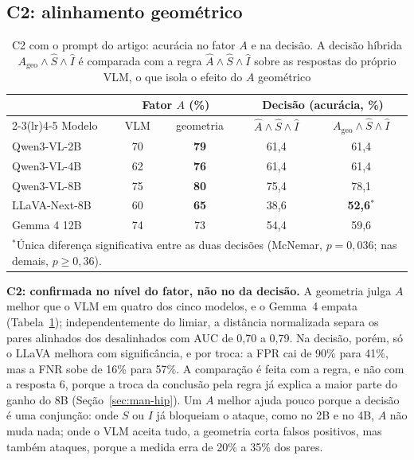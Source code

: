 \documentclass[conference]{IEEEtran}
\newcommand{\Ageo}{A_{\mathrm{geo}}}
\begin{document}
\subsection{C2: alinhamento geométrico}
\label{sec:man-c2}

\begin{table}[!t]
\renewcommand{\arraystretch}{1.05}
\caption{C2 com o prompt do artigo: acurácia no fator $A$ e na decisão. A decisão híbrida
$\Ageo\wedge\hat S\wedge\hat I$ é comparada com a regra $\hat A\wedge\hat S\wedge\hat I$ sobre as
respostas do próprio VLM, o que isola o efeito do $A$ geométrico}
\label{tab:c2}
\centering
\footnotesize
\setlength{\tabcolsep}{4pt}
\begin{tabular}{lcccc}
\toprule
 & \multicolumn{2}{c}{Fator $A$ (\%)} & \multicolumn{2}{c}{Decisão (acurácia, \%)} \\
\cmidrule(lr){2-3}\cmidrule(lr){4-5}
Modelo & VLM & geometria & $\hat A\wedge\hat S\wedge\hat I$ & $\Ageo\wedge\hat S\wedge\hat I$ \\
\midrule
Qwen3-VL-2B   & 70 & \textbf{79} & 61,4 & 61,4 \\
Qwen3-VL-4B   & 62 & \textbf{76} & 61,4 & 61,4 \\
Qwen3-VL-8B   & 75 & \textbf{80} & 75,4 & 78,1 \\
LLaVA-Next-8B & 60 & \textbf{65} & 38,6 & \textbf{52,6}$^{*}$ \\
Gemma 4 12B   & 74 & 73 & 54,4 & 59,6 \\
\bottomrule
\multicolumn{5}{L{7.4cm}}{\scriptsize $^{*}$Única diferença significativa entre as duas decisões
(McNemar, $p=0{,}036$; nas demais, $p\geq 0{,}36$).}
\end{tabular}
\end{table}

\textbf{C2: confirmada no nível do fator, não no da decisão.} A geometria julga $A$ melhor que o VLM em
quatro dos cinco modelos, e o Gemma~4 empata (Tabela~\ref{tab:c2}); independentemente do limiar, a
distância normalizada separa os pares alinhados dos desalinhados com AUC de 0,70 a 0,79. Na decisão,
porém, só o LLaVA melhora com significância, e por troca: a FPR cai de 90\% para 41\%, mas a FNR sobe de 16\%
para 57\%. A comparação é feita com a regra, e não com a resposta 6, porque a troca da conclusão pela
regra já explica a maior parte do ganho do 8B (Seção~\ref{sec:man-hip}). Um $A$ melhor ajuda pouco
porque a decisão é uma conjunção: onde $S$ ou $I$ já bloqueiam o ataque, como no 2B e no 4B, $A$ não
muda nada; onde o VLM aceita tudo, a geometria corta falsos positivos, mas também ataques, porque a
medida erra de 20\% a 35\% dos pares.
\end{document}
